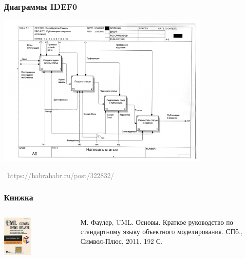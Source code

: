 \documentclass[xetex,mathserif,serif]{beamer}
\newcommand{\attribution}[1] {
	\vspace{-5mm}\begin{flushright}\begin{scriptsize}\textcolor{gray}{\textcopyright\, #1}\end{scriptsize}\end{flushright}
}
\begin{document}
	\begin{frame}
		\frametitle{Диаграммы IDEF0}
		\begin{center}
			\includegraphics[width=0.80\textwidth]{idef0.png}
			\attribution{https://habrahabr.ru/post/322832/}
		\end{center}
	\end{frame}

	\begin{frame}
		\frametitle{Книжка}
		\begin{columns}
			\begin{column}{0.5\textwidth}
				\begin{center}
					\includegraphics[width=0.4\textwidth]{umlBookCover.png}
				\end{center}
			\end{column}
			\begin{column}{0.5\textwidth}
				М. Фаулер, UML. Основы. Краткое руководство по стандартному языку объектного моделирования. СПб., Символ-Плюс, 2011. 192 С.
			\end{column}
		\end{columns}
	\end{frame}
\end{document}
